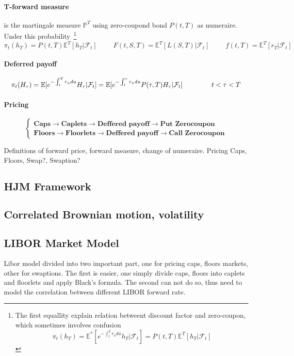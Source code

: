 \documentclass[a4paper,10pt]{article}
\newcommand{\E}{\mathbb{E}}
\newcommand{\Proba}{\mathbb{P}}
\newcommand{\F}{\mathcal{F}}
\newcommand{\PtT}{P(t,T)}
\newcommand{\Discount}[2]{e^{-\int_{#1}^{#2}r_u du} }
\begin{document}
\paragraph{T-forward measure} is the martingale measure $\Proba^{T}$ using zero-coupond bond $\PtT$ as numeraire. Under this probability~\footnote{The first equallity explain relation betweent discount factor and zero-coupon, which sometimes involves confusion \[\pi_t(h_T)=\E^{*}[e^{-\int^T_t r_udu}h_T|\F_t]= \PtT\E^{T}[h_T|\F_t]\]}
\[
\pi_t(h_T)=\PtT\E^{T}[h_T|\F_t]
\hspace{1cm}
F(t,S,T)=\E^{T}[L(S,T)|\F_t]
\hspace{1cm}
f(t,T)=\E^{T}[r_T|\F_t]
\]
\paragraph{Deferred payoff}
\[
\pi_t(H_{\tau})=\E[\Discount{t}{T}H_{\tau}|\F_t] = \E[\Discount{t}{\tau}P(\tau,T)H_{\tau}|\F_t]
\hspace{1.5cm}
t<\tau<T
\]
\paragraph{Pricing}
\[
\left\{
\begin{array}{l}
\textbf{Caps}\rightarrow\textbf{Caplets}\rightarrow\textbf{Deffered payoff} \rightarrow \textbf{Put Zerocoupon} \\
\textbf{Floors}\rightarrow\textbf{Floorlets}\rightarrow\textbf{Deffered payoff} \rightarrow \textbf{Call Zerocoupon}
\end{array}
\right.
\]



Definitions of forward price, forward measure, change of numeraire. Pricing Caps, Floors, Swap?, Swaption?

\subsection{HJM Framework}
\subsection{Correlated Brownian motion, volatility}
\subsection{LIBOR Market Model}
Libor model divided into two important part, one for pricing caps, floors markets, other for swaptions. The first is easier, one simply divide caps, floors into caplets and floorlets and apply Black's formula. The second can not do so, thus need to model the correlation between different LIBOR forward rate.
\end{document}
